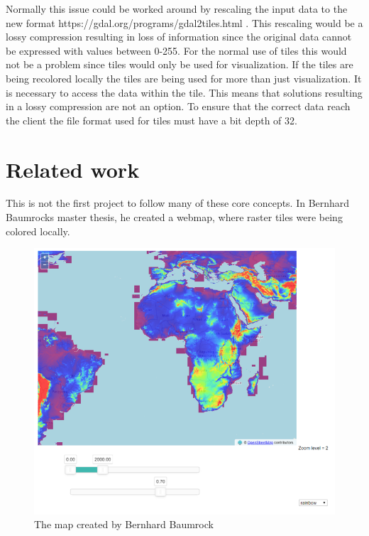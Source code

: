 Normally this issue could be worked around by rescaling the input data to the new format https://gdal.org/programs/gdal2tiles.html . This rescaling would be a lossy compression resulting in loss of information since the original data cannot be expressed with values between 0-255. \citep{dent}
For the normal use of tiles this would not be a problem since tiles would only be used for visualization. 
If the tiles are being recolored locally the tiles are being used for more than just visualization. It is necessary to access the data within the tile. This means that solutions resulting in a lossy compression are not an option. To ensure that the correct data reach the client the file format used for tiles must have a bit depth of 32. 







\section{Related work}
This is not the first project to follow many of these core concepts. In Bernhard Baumrocks master thesis, he created a webmap, where raster tiles were being colored locally. \citep{Buamrocks}
\begin{figure} [H]
	\centering
	\includegraphics[width=.8\textwidth]{Pictures/BaumrockMap1}
	\caption{The map created by Bernhard Baumrock}
	\label{BaumrockMap1}
\end{figure}

